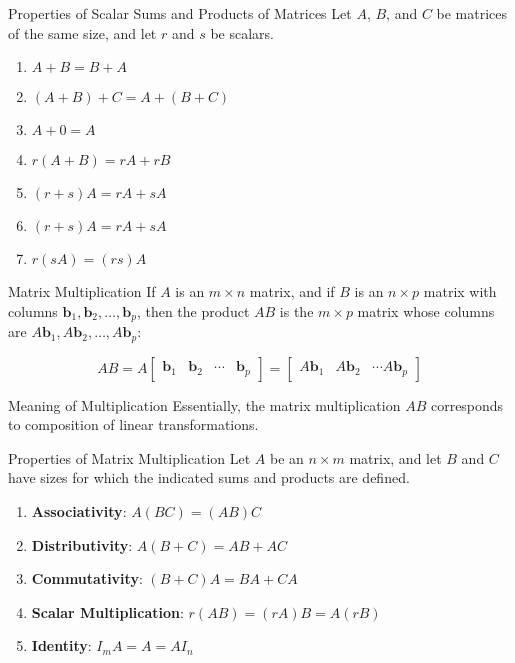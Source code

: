 \documentclass{article}
\begin{document}
\begin{theorem}{Properties of Scalar Sums and Products of Matrices}
	Let $A$, $B$, and $C$ be matrices of the same size, and let $r$ and $s$ be scalars.

	\begin{enumerate}[label=\alph*)]
		\item
		      $A + B = B + A$
		\item
		      $(A + B) + C = A + (B + C)$
		\item
		      $A + 0 = A$
		\item
		      $r(A + B) = rA + rB$
		\item
		      $(r + s)A = rA + sA$
		\item
		      $(r + s)A = rA + sA$
		\item
		      $r(sA) = (rs)A$
	\end{enumerate}
\end{theorem}

\begin{definition}{Matrix Multiplication}
	If $A$ is an $m \times n$ matrix, and if $B$ is an $n \times p$ matrix with columns $\mathbf{b}_1, \mathbf{b}_2, \ldots, \mathbf{b}_p$, then the product $AB$ is the $m \times p$ matrix whose columns are $A\mathbf{b}_1, A\mathbf{b}_2, \ldots, A\mathbf{b}_p$:

	$$
		AB = A\begin{bmatrix} \mathbf{b}_1 & \mathbf{b}_2 & \cdots & \mathbf{b}_p \end{bmatrix} = \begin{bmatrix} A\mathbf{b}_1 & A\mathbf{b}_2 & \cdots A\mathbf{b}_p \end{bmatrix}
	$$

	\begin{info}{Meaning of Multiplication}
		Essentially, the matrix multiplication $AB$ corresponds to composition of linear transformations.
	\end{info}
\end{definition}

\begin{theorem}{Properties of Matrix Multiplication}
	Let $A$ be an $n \times m$ matrix, and let $B$ and $C$ have sizes for which the indicated sums and products are defined.
	\begin{enumerate}[label=\alph*)]
		\item \textbf{Associativity}:
		      $A(BC) = (AB)C$
		\item \textbf{Distributivity}:
		      $A(B + C) = AB + AC$
		\item \textbf{Commutativity}:
		      $(B + C)A = BA + CA$
		\item \textbf{Scalar Multiplication}:
		      $r(AB) = (rA)B = A(rB)$
		\item \textbf{Identity}:
		      $I_mA = A = AI_n$
	\end{enumerate}
\end{theorem}
\end{document}

